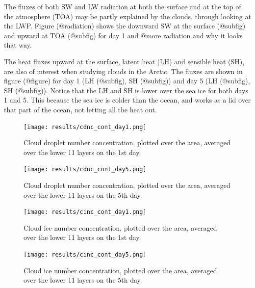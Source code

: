 The fluxes of both SW and LW radiation at both the surface and at the top of the atmosphere (TOA) may be partly explained by the clouds, through looking at the LWP. Figure (@radiation) shows the downward SW at the surface (@subfig) and upward at TOA (@subfig) for day 1 and @more radiation and why it looks that way.

The heat fluxes upward at the surface, latent heat (LH) and sensible heat (SH), are also of interest when studying clouds in the Arctic. The fluxes are shown in figure (@figure) for day 1 (LH (@subfig), SH (@subfig)) and day 5 (LH (@subfig), SH (@subfig)). Notice that the LH and SH is lower over the sea ice for both days 1 and 5. This because the sea ice is colder than the ocean, and works as a lid over that part of the ocean, not letting all the heat out.

\begin{figure}[h]
\centering
\texttt{[image: results/cdnc\_cont\_day1.png]}
\caption{Cloud droplet number concentration, plotted over the area, averaged over the lower 11 layers on the 1st day.}
\label{fig:cdnc_cont_Day1}
\end{figure}

\begin{figure}[h]
\centering
\texttt{[image: results/cdnc\_cont\_day5.png]}
\caption{Cloud droplet number concentration, plotted over the area, averaged over the lower 11 layers on the 5th day.}
\label{fig:cdnc_cont_Day5}
\end{figure}

\begin{figure}[h]
\centering
\texttt{[image: results/cinc\_cont\_day1.png]}
\caption{Cloud ice number concentration, plotted over the area, averaged over the lower 11 layers on the 1st day.}
\label{fig:cinc_cont_Day1}
\end{figure}

\begin{figure}[h]
\centering
\texttt{[image: results/cinc\_cont\_day5.png]}
\caption{Cloud ice number concentration, plotted over the area, averaged over the lower 11 layers on the 5th day.}
\label{fig:cinc_cont_Day5}
\end{figure}


